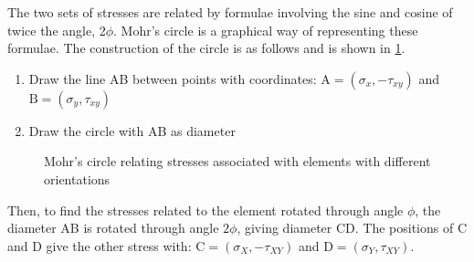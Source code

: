The two sets of stresses are related by formulae involving the sine and cosine of twice the angle, 2\(\phi\). Mohr's circle is a graphical way of representing these formulae. The construction of the circle is as follows and is shown in \cref{fig-m-circle}.

\begin{enumerate}
  \item Draw the line AB between points with coordinates: \(\text{A} = (\sigma_x, -\tau_{xy}) \) and \(\text{B} = (\sigma_y, \tau_{xy}) \)
  \item Draw the circle with AB as diameter
\end{enumerate}



\begin{figure}[h!]
  \center{}
  \caption{Mohr's circle relating stresses associated with elements with different orientations}
  \label{fig-m-circle}
\end{figure}

Then, to find the stresses related to the element rotated through angle \(\phi\), the diameter AB is rotated through angle \(2\phi\), giving diameter CD. The positions of C and D give the other stress with: \(\text{C} = (\sigma_X, -\tau_{XY}) \) and \(\text{D} = (\sigma_Y, \tau_{XY}) \).

